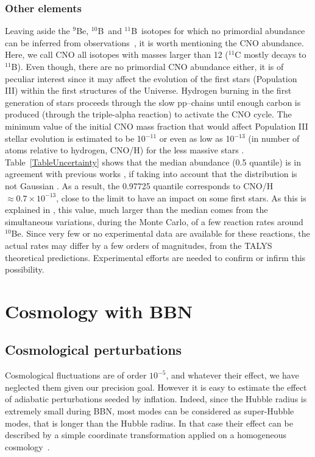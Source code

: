\documentclass[onecolumn,float,floatfix,preprintnumbers,aps,rmp,nofootinbib,amsmath,amssymb,amsfonts,superscriptaddress,tightenlines]{revtex4}
\newcommand{\neu}{$^{9}$Be}
\newcommand{\dix}{$^{10}$B}
\newcommand{\onz}{$^{11}$B}
\begin{document}
\subsubsection{Other elements}

Leaving aside the \neu, \dix\ and \onz\ isotopes for which no primordial abundance can be inferred from observations~\citep{Coc14}, 
it is worth mentioning the CNO abundance. Here, we call CNO all isotopes with masses larger than 12 ($^{11}$C mostly decays to \onz).
Even though, there are no primordial CNO abundance either,  it is of peculiar interest since it may affect the evolution of the first stars 
(Population III) within the first structures of the Universe. Hydrogen burning in the first generation of stars proceeds through the slow 
pp--chains until enough carbon is produced (through the triple-alpha reaction) to activate the CNO cycle. The minimum value of the 
initial CNO mass fraction that would affect Population III stellar evolution is estimated  to be 10$^{-11}$ \cite{Cas93}  or
even as low as  10$^{-13}$ (in number of atoms relative to hydrogen, CNO/H) for the less massive stars \cite{Eks08}. 
Table~\ref{TableUncertainty} shows that the median abundance (0.5 quantile) is in agreement  with previous works \cite{Ioc07,Coc12a},
if taking into account that the distribution is not Gaussian \cite{Coc14,NIC2014}. As a result, the 0.97725 quantile corresponds to
CNO/H$\approx0.7\times10^{-13}$, close to the limit to have an impact on some first stars.     
As this is explained in \citet{Coc14}, this value, much larger than the median comes from the simultaneous variations, during the 
Monte Carlo,  of a few reaction rates around $^{10}$Be. Since very few or no experimental data are available for these reactions,
the actual rates may differ by a few orders of magnitudes, from the TALYS \cite{TALYS} theoretical predictions. Experimental
efforts are needed to confirm or infirm this possibility.


\section{Cosmology with BBN}


\subsection{Cosmological perturbations}

Cosmological fluctuations are of order $10^{-5}$, and whatever their
effect, we have neglected them given our precision goal. However it is easy
to estimate the effect of adiabatic perturbations seeded by inflation. Indeed, since the Hubble
radius is extremely small during BBN, most modes can be considered as
super-Hubble modes, that is longer than the Hubble radius. In that case their
effect can be described by a simple coordinate transformation applied
on a homogeneous cosmology~\citep{Weinberg:2003sw,Creminelli:2011sq,Mirbabayi:2014hda}.
\end{document}
